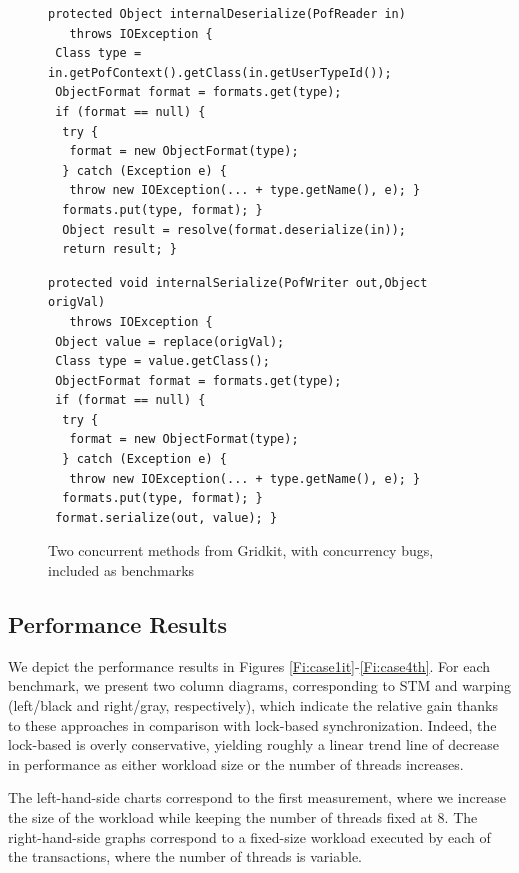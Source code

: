 \begin{figure}
	\begin{lstlisting}
protected Object internalDeserialize(PofReader in) 
   throws IOException {
 Class type = in.getPofContext().getClass(in.getUserTypeId());
 ObjectFormat format = formats.get(type);
 if (format == null) {
  try {
   format = new ObjectFormat(type);
  } catch (Exception e) {
   throw new IOException(... + type.getName(), e); }
  formats.put(type, format); }
  Object result = resolve(format.deserialize(in));
  return result; }
	\end{lstlisting}

	\begin{lstlisting}
protected void internalSerialize(PofWriter out,Object origVal) 
   throws IOException {
 Object value = replace(origVal);
 Class type = value.getClass();
 ObjectFormat format = formats.get(type);
 if (format == null) {
  try {
   format = new ObjectFormat(type);
  } catch (Exception e) {
   throw new IOException(... + type.getName(), e); }
  formats.put(type, format); }
 format.serialize(out, value); }
	\end{lstlisting}
	\caption{\label{Fi:gridkitPair}Two concurrent methods from Gridkit, with concurrency bugs, included as benchmarks}
\end{figure}

\subsection{Performance Results} 

We depict the performance results in Figures \ref{Fi:case1it}-\ref{Fi:case4th}. 
For each benchmark, we present two column diagrams, corresponding to STM and warping (left/black and right/gray, respectively), which indicate the relative gain thanks to these approaches in comparison with lock-based synchronization. Indeed, the lock-based is overly conservative, yielding roughly a linear trend line of decrease in performance as either workload size or the number of threads increases.

The left-hand-side charts correspond to the first measurement, where we increase the size of the workload while keeping the number of threads fixed at 8. The right-hand-side graphs correspond to a fixed-size workload executed by each of the transactions, where the number of threads is variable.

